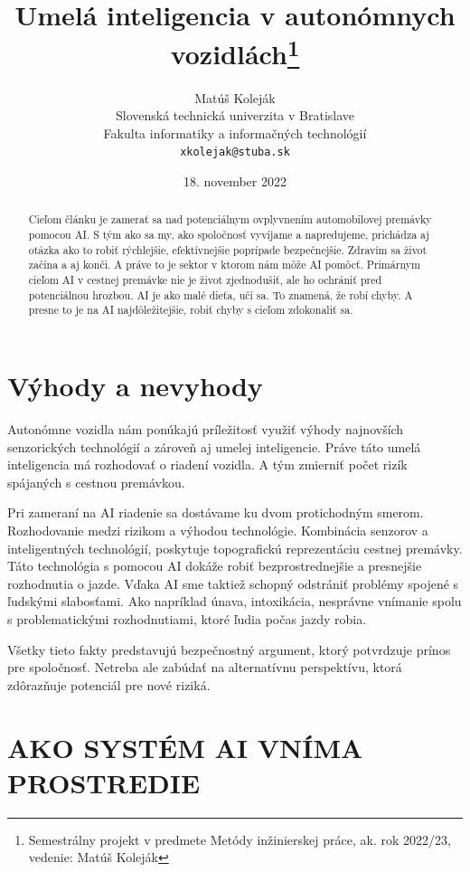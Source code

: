 \documentclass[10pt,oneside,slovak,a4paper]{article}
\title{Umelá inteligencia v autonómnych vozidlách\thanks{Semestrálny projekt v predmete Metódy inžinierskej práce, ak. rok 2022/23, vedenie: Matúš Koleják}} %
\author{Matúš Koleják\\[2pt]
	{\small Slovenská technická univerzita v Bratislave}\\
	{\small Fakulta informatiky a informačných technológií}\\
	{\small \texttt{xkolejak@stuba.sk}}
	}
\date{\small 18. november 2022} %
\begin{document}
\maketitle

\begin{abstract}
Cieľom článku je zamerať sa nad potenciálnym ovplyvnením automobilovej premávky pomocou AI. S tým ako sa my, ako spoločnosť vyvíjame a napredujeme, prichádza aj otázka ako to robiť rýchlejšie, efektívnejšie poprípade bezpečnejšie. Zdravím sa život začína a aj konči. A práve to je sektor v ktorom nám môže AI pomôcť. Primárnym cieľom AI v cestnej premávke nie je život zjednodušiť, ale ho ochrániť pred potenciálnou hrozbou. AI je ako malé dieťa, učí sa. To znamená, že robí chyby. A presne to je na AI najdôležitejšie, robiť chyby s cieľom zdokonaliť sa.
\end{abstract}

%
\newpage

\section{Výhody a nevyhody}\label{rizika}

Autonómne vozidla nám ponúkajú príležitosť využiť výhody najnovších senzorických technológií a zároveň aj umelej inteligencie. Práve táto umelá inteligencia má rozhodovať o riadení vozidla. A tým zmierniť počet rizík spájaných s cestnou premávkou. \par Pri zameraní na AI riadenie sa dostávame ku dvom protichodným smerom. Rozhodovanie medzi rizikom a výhodou technológie. Kombinácia senzorov a inteligentných technológií, poskytuje topografickú reprezentáciu cestnej premávky. Táto technológia s pomocou AI dokáže robiť bezprostrednejšie a presnejšie rozhodnutia o jazde. Vďaka AI sme taktiež schopný odstrániť problémy spojené s ľudskými slabosťami. Ako napríklad únava, intoxikácia, nesprávne vnímanie spolu s problematickými rozhodnutiami, ktoré ľudia počas jazdy robia.\par Všetky tieto fakty predstavujú bezpečnostný argument, ktorý potvrdzuje prínos pre spoločnosť. Netreba ale zabúdať na alternatívnu perspektívu, ktorá zdôrazňuje potenciál pre nové riziká.
\cite{floridi2018ai4people,doi:10.1080/08839514.2019.1600301}



\section{AKO SYSTÉM AI VNÍMA PROSTREDIE}\label{viditelnot}
\end{document}
